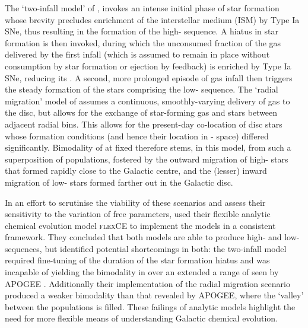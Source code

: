 The `two-infall model' of \citet{1997ApJ...477..765C,2001ApJ...554.1044C}, invokes an intense initial phase of star formation whose brevity precludes enrichment of the interstellar medium (ISM) by Type Ia SNe, thus resulting in the formation of the high-\afe{} sequence. A hiatus in star formation is then invoked, during which the unconsumed fraction of the gas delivered by the first infall (which is assumed to remain in place without consumption by star formation or ejection by feedback) is enriched by Type Ia SNe, reducing its \afe{}. A second, more prolonged episode of gas infall then triggers the steady formation of the stars comprising the low-\afe{} sequence. The `radial migration' model of \citet{2009MNRAS.396..203S} assumes a continuous, smoothly-varying delivery of gas to the disc, but allows for the exchange of star-forming gas and stars between adjacent radial bins. This allows for the present-day co-location of disc stars whose formation conditions (and hence their location in \afe{}-\feh{} space) differed significantly. Bimodality of \afe{} at fixed \feh{} therefore stems, in this model, from such a superposition of populations, fostered by the outward migration of high-\afe{} stars that formed rapidly close to the Galactic centre, and the (lesser) inward migration of low-\afe{} stars formed farther out in the Galactic disc. 

 In an effort to scrutinise the viability of these scenarios and assess their sensitivity to the variation of free parameters, \citet{2016arXiv160408613A} used their flexible analytic chemical evolution model \textsc{flexCE} to implement the models in a consistent framework. They concluded that both models are able to produce high- and low-\afe{} sequences, but identified potential shortcomings in both: the two-infall model required fine-tuning of the duration of the star formation hiatus and was incapable of yielding the bimodality in \afe{} over an extended a range of \feh{} seen by APOGEE \citep[seen in, e.g.][]{2014ApJ...796...38N,2015ApJ...808..132H}. Additionally their implementation of the radial migration scenario produced a weaker bimodality than that revealed by APOGEE, where the `valley' between the populations is filled. These failings of analytic models highlight the need for more flexible means of understanding Galactic chemical evolution.
 
